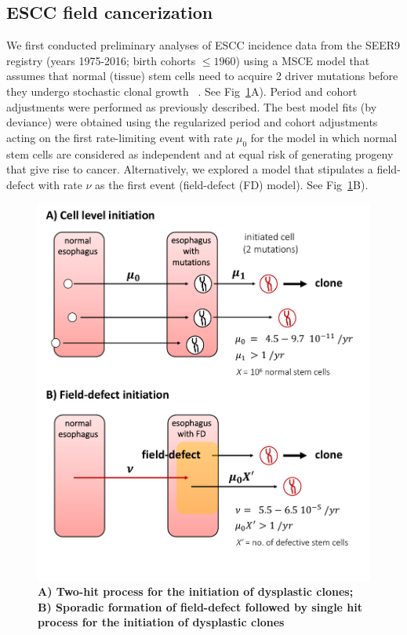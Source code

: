\documentclass[10pt,letterpaper]{article}
\begin{document}
\subsection*{ESCC field cancerization}
We first conducted preliminary analyses of ESCC incidence data from the SEER9 registry (years 1975-2016; birth cohorts $\leq 1960$) using a MSCE model that assumes that normal (tissue) stem cells need to acquire 2 driver mutations before they undergo stochastic clonal growth ~\cite{Luebeck2013}. See Fig~\ref{fig3}A). Period and cohort adjustments were performed as previously described. The best model fits (by deviance) were obtained using the regularized period and cohort adjustments acting on the first rate-limiting event with rate $\mu_0$ for the model in which normal stem cells are considered as independent and at equal risk of generating progeny that give rise to cancer. Alternatively, we explored a model that stipulates a field-defect with rate $\nu$ as the first event (field-defect (FD) model). See Fig~\ref{fig3}B). 
\medskip
\begin{figure}[!ht]
\begin{adjustwidth}{0.25in}{0in} %
\includegraphics[scale=0.5, trim=0 0 0 0]{Fig3.pdf}
\caption{{\bf A) Two-hit process for the initiation of dysplastic clones; B) Sporadic formation of field-defect followed by single hit process for the initiation of dysplastic clones}}
\label{fig3}
\end{adjustwidth}
\end{figure}
\end{document}
